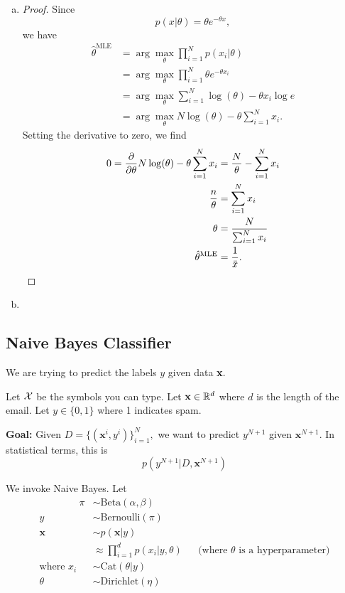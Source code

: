 \documentclass{chaistyle}
\begin{document}
\begin{enumerate}[(a)]
    \item \begin{proof}
        Since \[p(x|\theta)=\theta e^{-\theta x},\] we have \begin{align*}
            \hat\theta^{\text{MLE}} &= \arg\max_\theta \prod_{i=1}^{N} p(x_i|\theta) \\ 
            &= \arg\max_\theta \prod_{i=1}^{N} \theta e^{-\theta x_i} \\
            &= \arg\max_\theta \sum_{i=1}^{N} \log(\theta) -\theta x_i\log e \\
            &= \arg\max_\theta N\log(\theta) - \theta\sum_{i=1}^{N} x_i.
        \end{align*}
        Setting the derivative to zero, we find \begin{align*}
            0 = \frac{\partial }{\partial \theta} N\log(\theta) - \theta\sum_{i=1}^{N} x_i &= \frac{N}{\theta}-\sum_{i=1}^{N} x_i \\
            \frac{n}{\theta} &= \sum_{i=1}^{N} x_i \\
            \theta &= \frac{N}{\sum_{i=1}^{N} x_i} \\
            \hat\theta^{\text{MLE}} &= \frac{1}{\bar{x}}.
        \end{align*}
    \end{proof}
    \item \begin{solution}
        
    \end{solution}
\end{enumerate}
\subsection*{Naive Bayes Classifier}
We are trying to predict the labels \(y\) given data \(\bf x.\)
\begin{example*}
    Let \(\cal X\) be the symbols you can type. Let \(\mathbf{x}\in\mathbb{R}^d\) where \(d\) is the length of the email. Let \(y\in\{0,1\}\) where 1 indicates spam.

    \textbf{Goal:} Given \(D=\{(\mathbf{x}^i,y^i)\}_{i=1}^N,\) we want to predict \(y^{N+1}\) given \(\mathbf{x}^{N+1}.\) In statistical terms, this is \[p(y^{N+1}|D,\textbf{x}^{N+1})\]
\end{example*}
We invoke Naive Bayes. Let \begin{align*}
    \qquad\qquad\pi&\sim\text{Beta}(\alpha,\beta) \\
    y&\sim\text{Bernoulli}(\pi) \\ 
    \mathbf{x}&\sim p(\textbf {x}|y) \\ 
    &\approx \prod_{i=1}^{d} p(x_i|y,\theta) &&\text{(where \(\theta\) is a hyperparameter)} \\
    \text{where }x_i&\sim\text{Cat}(\theta|y) \\
    \theta&\sim\text{Dirichlet}(\eta) \\
\end{align*}
\end{document}
